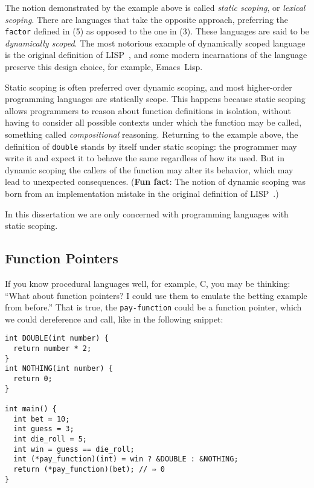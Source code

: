 \documentclass[12pt, oneside]{book}
\begin{document}
The notion demonstrated by the example above is called \emph{static scoping}, or \emph{lexical scoping}. There are languages that take the opposite approach, preferring the \texttt{factor} defined in (5) as opposed to the one in (3). These languages are said to be \emph{dynamically scoped}. The most notorious example of dynamically scoped language is the original definition of LISP~\cite{original-lisp-paper}, and some modern incarnations of the language preserve this design choice, for example, Emacs~Lisp.

Static scoping is often preferred over dynamic scoping, and most higher-order programming languages are statically scope. This happens because static scoping allows programmers to reason about function definitions in isolation, without having to consider all possible contexts under which the function may be called, something called \emph{compositional} reasoning. Returning to the example above, the definition of \texttt{double} stands by itself under static scoping: the programmer may write it and expect it to behave the same regardless of how its used. But in dynamic scoping the callers of the function may alter its behavior, which may lead to unexpected consequences. (\textbf{Fun fact}: The notion of dynamic scoping was born from an implementation mistake in the original definition of LISP~\cite{history-of-lisp}.)

In this dissertation we are only concerned with programming languages with static scoping.

\subsection{Function Pointers}

If you know procedural languages well, for example, C, you may be thinking: “What about function pointers? I could use them to emulate the betting example from before.” That is true, the \texttt{pay-function} could be a function pointer, which we could dereference and call, like in the following snippet:

\begin{Verbatim}
int DOUBLE(int number) {
  return number * 2;
}
int NOTHING(int number) {
  return 0;
}

int main() {
  int bet = 10;
  int guess = 3;
  int die_roll = 5;
  int win = guess == die_roll;
  int (*pay_function)(int) = win ? &DOUBLE : &NOTHING;
  return (*pay_function)(bet); // ⇒ 0
}
\end{Verbatim}
\end{document}
